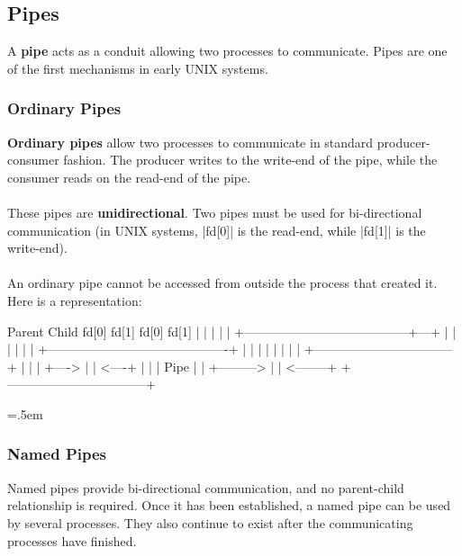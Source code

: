 \documentclass{article}
\newenvironment{cverbatim}
 {\SaveVerbatim{cverb}}
 {\endSaveVerbatim
  \flushleft\fboxrule=0pt\fboxsep=.5em
  \colorbox{cverbbg}{\BUseVerbatim{cverb}}%
  \endflushleft
}
\begin{document}
\subsection{Pipes}
A \textbf{pipe} acts as a conduit allowing two processes to communicate. Pipes are one of the first mechanisms in early UNIX systems.

\subsubsection{Ordinary Pipes}
\textbf{Ordinary pipes} allow two processes to communicate in standard producer-consumer fashion. The producer writes to the write-end of the pipe, while the consumer reads on the read-end of the pipe. \\ \\
These pipes are \textbf{unidirectional}. Two pipes must be used for bi-directional communication (in UNIX systems, \cverb|fd[0]| is the read-end, while \cverb|fd[1]| is the write-end). \\ \\
An ordinary pipe cannot be accessed from outside the process that created it. Here is a representation:

\begin{cverbatim}
      Parent                                           Child
  fd[0]    fd[1]                                   fd[0]   fd[1]
   |        |                                       |       |
   |        +---------------------------------------+---+   |
   |                                                |   |   |
   |    +-------------------------------------------+   |   |
   |    |                                               |   |
   |    |      +---------------------------------+      |   |
   |    +----> |                                 | <----+   |
   |           |              Pipe               |          |
   +---------> |                                 | <--------+
               +---------------------------------+
                
\end{cverbatim}

\subsubsection{Named Pipes}
Named pipes provide bi-directional communication, and no parent-child relationship is required. Once it has been established, a named pipe can be used by several processes. They also continue to exist after the communicating processes have finished.
\end{document}
